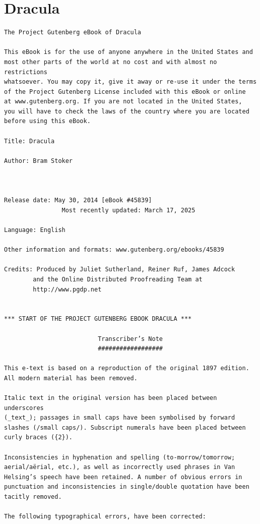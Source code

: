\documentclass{article}
\begin{document}
\section*{Dracula}
\begin{verbatim}
The Project Gutenberg eBook of Dracula

This eBook is for the use of anyone anywhere in the United States and
most other parts of the world at no cost and with almost no restrictions
whatsoever. You may copy it, give it away or re-use it under the terms
of the Project Gutenberg License included with this eBook or online
at www.gutenberg.org. If you are not located in the United States,
you will have to check the laws of the country where you are located
before using this eBook.

Title: Dracula

Author: Bram Stoker



Release date: May 30, 2014 [eBook #45839]
                Most recently updated: March 17, 2025

Language: English

Other information and formats: www.gutenberg.org/ebooks/45839

Credits: Produced by Juliet Sutherland, Reiner Ruf, James Adcock
        and the Online Distributed Proofreading Team at
        http://www.pgdp.net


*** START OF THE PROJECT GUTENBERG EBOOK DRACULA ***

                          Transcriber’s Note
                          ##################

This e-text is based on a reproduction of the original 1897 edition.
All modern material has been removed.

Italic text in the original version has been placed between underscores
(_text_); passages in small caps have been symbolised by forward
slashes (/small caps/). Subscript numerals have been placed between
curly braces ({2}).

Inconsistencies in hyphenation and spelling (to-morrow/tomorrow;
aerial/aërial, etc.), as well as incorrectly used phrases in Van
Helsing’s speech have been retained. A number of obvious errors in
punctuation and inconsistencies in single/double quotation have been
tacitly removed.

The following typographical errors, have been corrected:


\end{verbatim}
\end{document}
